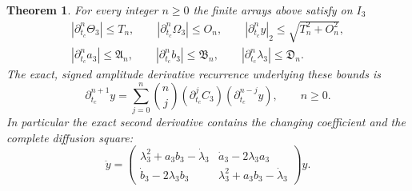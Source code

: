 \documentclass[11pt]{article}
\newtheorem{theorem}{Theorem}
\begin{document}
\begin{theorem}\label{tgdc:all_orders}
For every integer $n\geq0$ the finite arrays above satisfy on $I_3$
\begin{equation}\label{tgdc:all_order_bounds}
\begin{gathered}
 |\partial_{t_c}^n\Theta_3|\leq T_n,\qquad
 |\partial_{t_c}^n\Omega_3|\leq O_n,\qquad
 |\partial_{t_c}^ny|_2\leq\sqrt{T_n^2+O_n^2},\\
 |\partial_{t_c}^na_3|\leq\mathfrak A_n,\qquad
 |\partial_{t_c}^nb_3|\leq\mathfrak B_n,\qquad
 |\partial_{t_c}^n\lambda_3|\leq\mathfrak D_n.
\end{gathered}
\end{equation}
The exact, signed amplitude derivative recurrence underlying these
bounds is
\begin{equation}\label{tgdc:exact_derivative_recurrence}
 \partial_{t_c}^{n+1}y
     =\sum_{j=0}^n\binom nj
            (\partial_{t_c}^jC_3)(\partial_{t_c}^{n-j}y),
 \qquad n\geq0.
\end{equation}
In particular the exact second derivative contains the changing
coefficient and the complete diffusion square:
\begin{equation}\label{tgdc:second_derivative}
 \ddot y=
 \begin{pmatrix}
 \lambda_3^2+a_3b_3-\dot\lambda_3&\dot a_3-2\lambda_3a_3\\
 \dot b_3-2\lambda_3b_3&\lambda_3^2+a_3b_3-\dot\lambda_3
 \end{pmatrix}y.
\end{equation}
\end{theorem}
\end{document}
